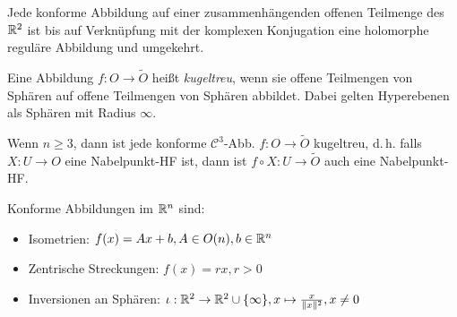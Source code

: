 \documentclass{cheat-sheet}
\begin{document}
\iffalse
\begin{bem}[Konforme Abbildungen im $\R^2$]
  Sei $O \opn \C \cong \R^2$ zusammenhängend und $f : O \to \widetilde{O}$ konform.
  Sei $\lambda : O \to \R_{> 0}$ der konforme Faktor, d.\,h. $\lambda(x)^{-1} D_x f \in O(n)$.
  Ohne Einschränkung ist $\det(D_x f) > 0$ für alle $x \in O$ (sonst $\widetilde{f} = f \circ \overline{\,\cdot\,}$).
  Es folgt: $D_x f = \lambda(x) \begin{psmallmatrix} \cos \alpha_x & \sin \alpha_x \\ -\sin \alpha_x & \cos \alpha_x \end{psmallmatrix} = \lambda(x) \cdot e^{i \alpha_x} \in \C$, also ist $f$ holomorph.
\end{bem}
\fi

\begin{satz}
  Jede konforme Abbildung auf einer zusammenhängenden offenen Teilmenge des $\R^2$ ist bis auf Verknüpfung mit der komplexen Konjugation eine holomorphe reguläre Abbildung und umgekehrt.
\end{satz}

\begin{defn}
  Eine Abbildung $f : O \to \widetilde{O}$ heißt \emph{kugeltreu}, wenn sie offene Teilmengen von Sphären auf offene Teilmengen von Sphären abbildet. Dabei gelten Hyperebenen als Sphären mit Radius $\infty$.
\end{defn}

\begin{satz}[Liouville]
  Wenn $n \geq 3$, dann ist jede konforme $\mathcal{C}^3$-Abb. $f : O \to \widetilde{O}$ kugeltreu, d.\,h. falls $X : U \to O$ eine Nabelpunkt-HF ist, dann ist $f \circ X : U \to \widetilde{O}$ auch eine Nabelpunkt-HF.
\end{satz}


\begin{bsp} Konforme Abbildungen im $\mathbb{R}^n$ sind:
  \begin{itemize}
    \item Isometrien: $f(x) = Ax + b, A \in O(n), b \in \mathbb{R}^n$
    \item Zentrische Streckungen: $f(x) = rx, r > 0$
    \item Inversionen an Sphären: $\iota : \mathbb{R}^2 \to \mathbb{R}^2 \cup \{ \infty \}, x \mapsto \tfrac{x}{\|x\|^2}, x \not= 0$
  \end{itemize}
\end{bsp}
\end{document}
